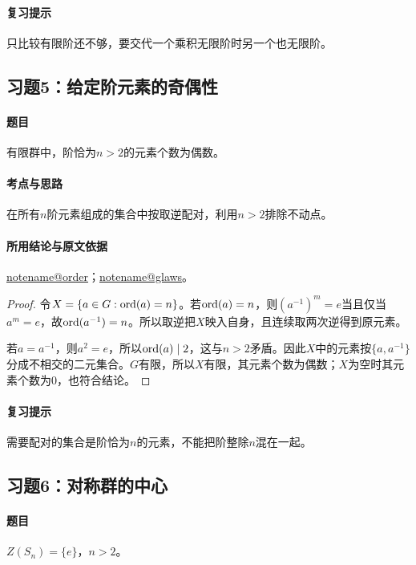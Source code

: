 \documentclass[UTF8,a4paper,11pt,fontset=windows]{ctexart}
\makeatletter
\newcommand{\noteref}[1]{\hyperref[note:#1]{\csname notename@#1\endcsname}}
\newcommand{\exref}[2]{\hyperref[ex:#1:#2]{第#1章习题#2}}
\makeatother
\begin{document}
\paragraph{复习提示}
只比较有限阶还不够，要交代一个乘积无限阶时另一个也无限阶。


\subsection{习题5：\texorpdfstring{给定阶元素的奇偶性}{给定阶元素的奇偶性}}
\label{ex:2:5}

\paragraph{题目}
有限群中，阶恰为$n>2$的元素个数为偶数。

\paragraph{考点与思路}
在所有$n$阶元素组成的集合中按取逆配对，利用$n>2$排除不动点。

\paragraph{所用结论与原文依据}
\noteref{order}；\noteref{glaws}。


\begin{proof}
令$X=\{a\in G:\operatorname{ord}(a)=n\}$。若$\operatorname{ord}(a)=n$，则$(a^{-1})^m=e$当且仅当$a^m=e$，故$\operatorname{ord}(a^{-1})=n$。所以取逆把$X$映入自身，且连续取两次逆得到原元素。

若$a=a^{-1}$，则$a^2=e$，所以$\operatorname{ord}(a)\mid2$，这与$n>2$矛盾。因此$X$中的元素按$\{a,a^{-1}\}$分成不相交的二元集合。$G$有限，所以$X$有限，其元素个数为偶数；$X$为空时其元素个数为0，也符合结论。
\end{proof}

\paragraph{复习提示}
需要配对的集合是阶恰为$n$的元素，不能把阶整除$n$混在一起。


\subsection{习题6：\texorpdfstring{对称群的中心}{对称群的中心}}
\label{ex:2:6}

\paragraph{题目}
$Z(S_n)=\{e\}$，$n>2$。
\end{document}
